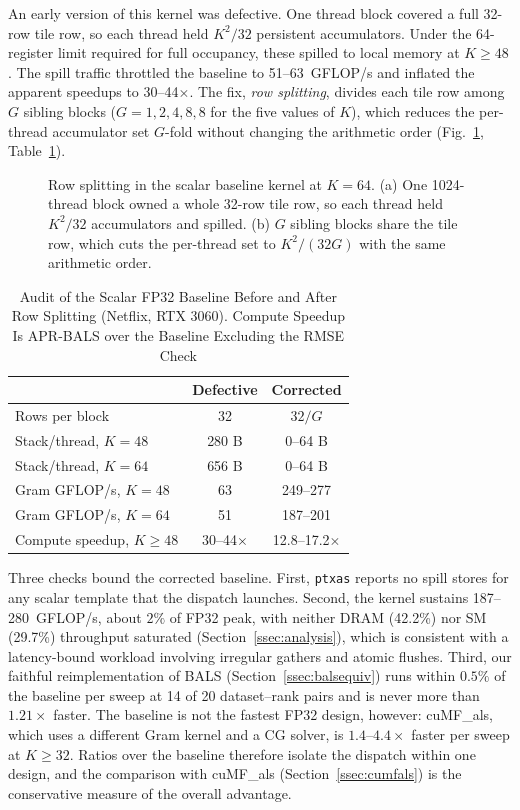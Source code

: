 An early version of this kernel was defective. One thread block covered a full 32-row tile row, so each thread held $K^{2}/32$ persistent accumulators. Under the 64-register limit required for full occupancy, these spilled to local memory at $K \ge 48$. The spill traffic throttled the baseline to 51--63~GFLOP/s and inflated the apparent speedups to 30--44$\times$. The fix, \textit{row splitting}, divides each tile row among $G$ sibling blocks ($G = 1, 2, 4, 8, 8$ for the five values of $K$), which reduces the per-thread accumulator set $G$-fold without changing the arithmetic order (Fig.~\ref{fig:rowsplit}, Table~\ref{tab:baselineaudit}).

\begin{figure}[!t]
\centering

\caption{Row splitting in the scalar baseline kernel at $K=64$. (a) One 1024-thread block owned a whole 32-row tile row, so each thread held $K^2/32$ accumulators and spilled. (b) $G$ sibling blocks share the tile row, which cuts the per-thread set to $K^2/(32G)$ with the same arithmetic order.}
\label{fig:rowsplit}
\end{figure}

\begin{table}[!t]
\caption{Audit of the Scalar FP32 Baseline Before and After Row Splitting (Netflix, RTX 3060). Compute Speedup Is APR-BALS over the Baseline Excluding the RMSE Check}
\label{tab:baselineaudit}
\centering
\footnotesize
\renewcommand{\arraystretch}{1.1}
\setlength{\tabcolsep}{4pt}
\begin{tabular}{lcc}
\toprule
 & \textbf{Defective} & \textbf{Corrected} \\
\midrule
Rows per block & 32 & $32/G$ \\
Stack/thread, $K{=}48$ & 280 B & 0--64 B \\
Stack/thread, $K{=}64$ & 656 B & 0--64 B \\
Gram GFLOP/s, $K{=}48$ & 63 & 249--277 \\
Gram GFLOP/s, $K{=}64$ & 51 & 187--201 \\
Compute speedup, $K \ge 48$ & 30--44$\times$ & 12.8--17.2$\times$ \\
\bottomrule
\end{tabular}
\end{table}

Three checks bound the corrected baseline. First, \texttt{ptxas} reports no spill stores for any scalar template that the dispatch launches. Second, the kernel sustains 187--280~GFLOP/s, about $2\%$ of FP32 peak, with neither DRAM (42.2\%) nor SM (29.7\%) throughput saturated (Section~\ref{ssec:analysis}), which is consistent with a latency-bound workload involving irregular gathers and atomic flushes. Third, our faithful reimplementation of BALS (Section~\ref{ssec:balsequiv}) runs within $0.5\%$ of the baseline per sweep at 14 of 20 dataset--rank pairs and is never more than $1.21\times$ faster. The baseline is not the fastest FP32 design, however: cuMF\_als, which uses a different Gram kernel and a CG solver, is $1.4$--$4.4\times$ faster per sweep at $K \ge 32$. Ratios over the baseline therefore isolate the dispatch within one design, and the comparison with cuMF\_als (Section~\ref{ssec:cumfals}) is the conservative measure of the overall advantage.


